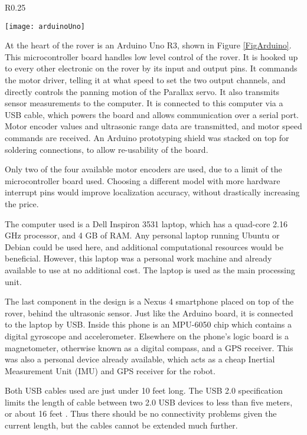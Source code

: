 \begin{wrapfigure}{R}{0.25\textwidth}
	\caption{\cite{fig_arduino_uno}}
	\centering
	\texttt{[image: arduinoUno]}
	\label{FigArduino}
\end{wrapfigure}

At the heart of the rover is an Arduino Uno R3, shown in Figure \ref{FigArduino}. This microcontroller board handles low level control of the rover. It is hooked up to every other electronic on the rover by its input and output pins. It commands the motor driver, telling it at what speed to set the two output channels, and directly controls the panning motion of the Parallax servo. It also transmits sensor measurements to the computer. It is connected to this computer via a USB cable, which powers the board and allows communication over a serial port. Motor encoder values and ultrasonic range data are transmitted, and motor speed commands are received. An Arduino prototyping shield was stacked on top for soldering connections, to allow re-usability of the board.

Only two of the four available motor encoders are used, due to a limit of the microcontroller board used. Choosing a different model with more hardware interrupt pins would improve localization accuracy, without drastically increasing the price.

The computer used is a Dell Inspiron 3531 laptop, which has a quad-core 2.16 GHz processor, and 4 GB of RAM. Any personal laptop running Ubuntu or Debian could be used here, and additional computational resources would be beneficial. However, this laptop was a personal work machine and already available to use at no additional cost. The laptop is used as the main processing unit.

The last component in the design is a Nexus 4 smartphone placed on top of the rover, behind the ultrasonic sensor. Just like the Arduino board, it is connected to the laptop by USB. Inside this phone is an MPU-6050 chip which contains a digital gyroscope and accelerometer. Elsewhere on the phone's logic board is a magnetometer, otherwise known as a digital compass, and a GPS receiver. This was also a personal device already available, which acts as a cheap Inertial Measurement Unit (IMU) and GPS receiver for the robot.

Both USB cables used are just under 10 feet long. The USB 2.0 specification limits the length of cable between two 2.0 USB devices to less than five meters, or about 16 feet \cite{usbForum}. Thus there should be no connectivity problems given the current length, but the cables cannot be extended much further. 

